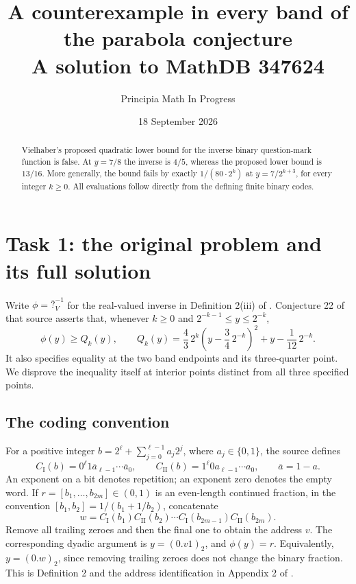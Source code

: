 \documentclass[11pt]{article}
\title{A counterexample in every band of the parabola conjecture\\
\large A solution to MathDB 347624}
\author{Principia Math In Progress}
\date{18 September 2026}
\newcommand{\CI}{C_{\mathrm I}}
\newcommand{\CII}{C_{\mathrm {II}}}
\begin{document}
\maketitle
\begin{abstract}
Vielhaber's proposed quadratic lower bound for the inverse binary
question-mark function is false. At $y=7/8$ the inverse is $4/5$,
whereas the proposed lower bound is $13/16$. More generally, the
bound fails by exactly $1/(80\cdot2^k)$ at $y=7/2^{k+3}$, for
every integer $k\geq0$. All evaluations follow directly from the
defining finite binary codes.
\end{abstract}

\section*{Task 1: the original problem and its full solution}
Write $\phi=\overline{?}_V^{-1}$ for the real-valued inverse in
Definition 2(iii) of \cite{V}. Conjecture 22 of that source asserts
that, whenever $k\geq0$ and $2^{-k-1}\leq y\leq2^{-k}$,
\begin{equation}\label{bound}
 \phi(y)\geq Q_k(y),\qquad
 Q_k(y)=\frac43\,2^k\left(y-\frac34\,2^{-k}\right)^2
               +y-\frac1{12}\,2^{-k}.
\end{equation}
It also specifies equality at the two band endpoints and its
three-quarter point. We disprove the inequality itself at interior
points distinct from all three specified points.

\subsection*{The coding convention}
For a positive integer $b=2^\ell+\sum_{j=0}^{\ell-1}a_j2^j$,
where $a_j\in\{0,1\}$, the source defines
\[
 \CI(b)=0^\ell1\overline a_{\ell-1}\cdots\overline a_0,
 \qquad
 \CII(b)=1^\ell0a_{\ell-1}\cdots a_0,
 \qquad \overline a=1-a.
\]
An exponent on a bit denotes repetition; an exponent zero denotes
the empty word. If $r=[b_1,\ldots,b_{2m}]\in(0,1)$ is an even-length
continued fraction, in the convention
$[b_1,b_2]=1/(b_1+1/b_2)$, concatenate
\[
 w=\CI(b_1)\CII(b_2)\cdots\CI(b_{2m-1})\CII(b_{2m}).
\]
Remove all trailing zeroes and then the final one to obtain the
address $v$. The corresponding dyadic argument is $y=(0.v1)_2$,
and $\phi(y)=r$. Equivalently, $y=(0.w)_2$, since removing trailing
zeroes does not change the binary fraction. This is Definition 2
and the address identification in Appendix 2 of \cite{V}.
\end{document}

